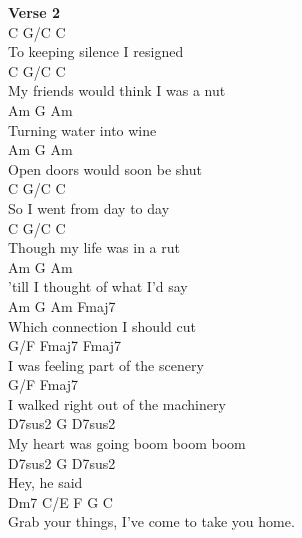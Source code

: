\documentclass[a4paper]{article}
\begin{document}
{{        }
        \textbf{Verse 2}
        ~\\
        {
            \cutive
            \obeyspaces
C  G/C  C
\\
           To keeping silence I resigned
\\
C  G/C  C
\\
           My friends would think I was a nut
\\
Am  G  Am
\\
           Turning water into wine
\\
Am  G  Am
\\
           Open doors would soon be shut
\\
C  G/C  C
\\
           So I went from day to day
\\
C  G/C  C
\\
           Though my life was in a rut
\\
Am  G  Am
\\
           'till I thought of what I'd say
\\
Am  G  Am                          Fmaj7
\\
           Which connection I should cut
\\
G/F      Fmaj7                    Fmaj7 
\\
I was feeling part of the scenery
\\
G/F      Fmaj7
\\
I walked right out of the machinery
\\
    D7sus2 G        D7sus2
\\
My heart was going boom boom boom
\\
D7sus2 G       D7sus2
\\
Hey,    he said
\\
Dm7       C/E         F       G        C    
\\
Grab your things, I've come to take you home.
\\

}}
\end{document}
